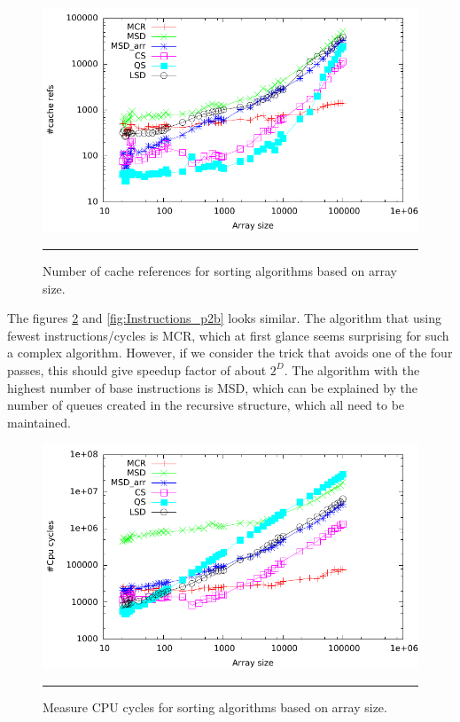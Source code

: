 \begin{figure}[htbp]
	\centering
		\includegraphics[width=\textwidth]{./Figures/Project2b/Cache_refs.pdf}
		\rule{35em}{0.5pt}
	\caption[Cache refs]{
	Number of cache references for sorting algorithms based on array size.
	}
	\label{fig:Cache_refs_p2b}
\end{figure}




The figures \ref{fig:Cpu_cycles_p2b} and \ref{fig:Instructions_p2b} looks similar.
The algorithm that using fewest instructions/cycles is MCR, which at first glance seems surprising for such a complex algorithm. However, if we consider the trick that avoids one of the four passes, this should give speedup factor of about $2^D$.
The algorithm with the highest number of base instructions is MSD, which can be explained by the number of queues created in the recursive structure, which all need to be maintained. 


\begin{figure}[htbp]
	\centering
		\includegraphics[width=\textwidth]{./Figures/Project2b/Cpu_cycles.pdf}
		\rule{35em}{0.5pt}
	\caption[CPU cycles]{
	Measure CPU cycles for sorting algorithms based on array size.
	}
	\label{fig:Cpu_cycles_p2b}
\end{figure}

